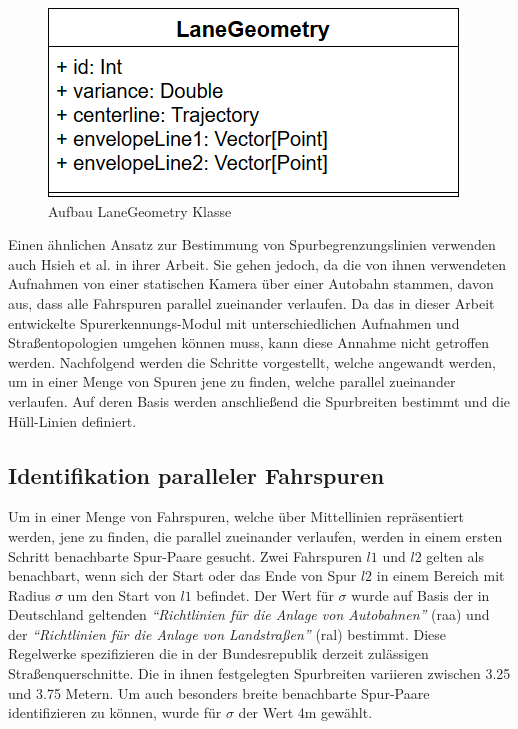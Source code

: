 \begin{figure}[H]
    \centering
    \includegraphics[width=0.38\linewidth]{../resources/img/umsetzung/U2/LaneGeometry_ClassDia}
    \caption{Aufbau LaneGeometry Klasse}
    \label{fig:real2_laneGeometry_ClassDia}
\end{figure}

Einen ähnlichen Ansatz zur Bestimmung von Spurbegrenzungslinien verwenden auch Hsieh et al. in ihrer Arbeit.
Sie gehen jedoch, da die von ihnen verwendeten
Aufnahmen von einer statischen Kamera über einer Autobahn stammen, davon aus, dass alle Fahrspuren parallel
zueinander verlaufen. Da das in dieser Arbeit entwickelte Spurerkennungs-Modul mit unterschiedlichen
Aufnahmen und Straßentopologien umgehen können muss, kann diese Annahme nicht getroffen werden.
Nachfolgend werden die Schritte vorgestellt, welche angewandt werden, um in einer Menge von Spuren
jene zu finden, welche parallel zueinander verlaufen. Auf deren Basis werden anschließend die Spurbreiten bestimmt und
die Hüll-Linien definiert.

\subsection*{Identifikation paralleler Fahrspuren}
\label{sec:real2_identify_parallel_lanes}

Um in einer Menge von Fahrspuren, welche über Mittellinien repräsentiert werden, jene zu finden, die
parallel zueinander verlaufen, werden in einem ersten Schritt benachbarte Spur-Paare gesucht.
Zwei Fahrspuren $l1$ und $l2$ gelten als benachbart, wenn sich der Start oder das Ende
von Spur $l2$ in einem Bereich mit Radius $\sigma$ um den Start von $l1$ befindet.
Der Wert für $\sigma$ wurde auf Basis der in Deutschland geltenden
\textit{``Richtlinien für die Anlage von Autobahnen''} (\acrshort*{raa}) \cite[]{RAA2008}
und der \textit{``Richtlinien für die Anlage von Landstraßen''} (\acrshort*{ral}) \cite[]{RAL2012} bestimmt. Diese Regelwerke spezifizieren
die in der Bundesrepublik derzeit zulässigen Straßenquerschnitte. Die in ihnen festgelegten
Spurbreiten variieren zwischen 3.25 und 3.75 Metern.
Um auch besonders breite benachbarte Spur-Paare identifizieren zu können, wurde für $\sigma$ der Wert 4m gewählt.

